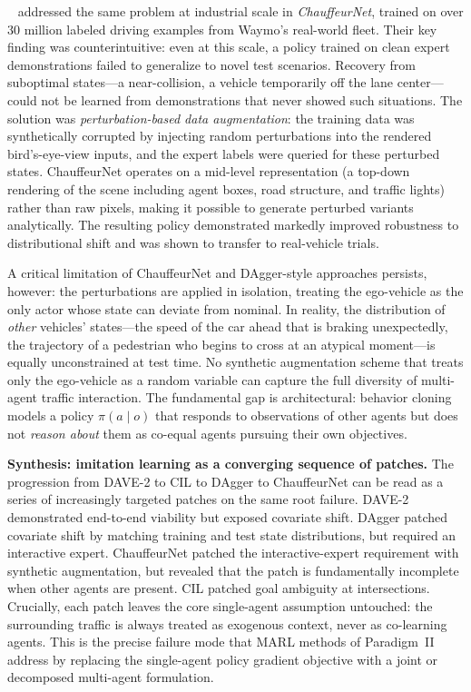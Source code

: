 \documentclass[12pt, a4paper]{article}
\begin{document}
\citeauthor{bansal2018chauffeur}~\cite{bansal2018chauffeur} addressed the same
problem at industrial scale in \emph{ChauffeurNet}, trained on over 30 million
labeled driving examples from Waymo's real-world fleet.  Their key finding was
counterintuitive: even at this scale, a policy trained on clean expert
demonstrations failed to generalize to novel test scenarios.  Recovery from
suboptimal states---a near-collision, a vehicle temporarily off the lane
center---could not be learned from demonstrations that never showed such
situations.  The solution was \emph{perturbation-based data augmentation}: the
training data was synthetically corrupted by injecting random perturbations into
the rendered bird's-eye-view inputs, and the expert labels were queried for
these perturbed states.  ChauffeurNet operates on a mid-level representation
(a top-down rendering of the scene including agent boxes, road structure, and
traffic lights) rather than raw pixels, making it possible to generate
perturbed variants analytically.  The resulting policy demonstrated markedly
improved robustness to distributional shift and was shown to transfer to
real-vehicle trials.

A critical limitation of ChauffeurNet and DAgger-style approaches persists,
however: the perturbations are applied in isolation, treating the ego-vehicle
as the only actor whose state can deviate from nominal.  In reality, the
distribution of \emph{other} vehicles' states---the speed of the car ahead
that is braking unexpectedly, the trajectory of a pedestrian who begins to
cross at an atypical moment---is equally unconstrained at test time.  No
synthetic augmentation scheme that treats only the ego-vehicle as a random
variable can capture the full diversity of multi-agent traffic interaction.
The fundamental gap is architectural: behavior cloning models a policy
$\pi(a \mid o)$ that responds to observations of other agents but does not
\emph{reason about} them as co-equal agents pursuing their own objectives.

\smallskip\noindent\textbf{Synthesis: imitation learning as a converging sequence of
patches.}  The progression from DAVE-2 to CIL to DAgger to ChauffeurNet can
be read as a series of increasingly targeted patches on the same root failure.
DAVE-2 demonstrated end-to-end viability but exposed covariate shift.
DAgger patched covariate shift by matching training and test state distributions,
but required an interactive expert.  ChauffeurNet patched the interactive-expert
requirement with synthetic augmentation, but revealed that the patch is
fundamentally incomplete when other agents are present.  CIL patched goal
ambiguity at intersections.  Crucially, each patch leaves the core single-agent
assumption untouched: the surrounding traffic is always treated as exogenous
context, never as co-learning agents.  This is the precise failure mode that
MARL methods of Paradigm~II address by replacing the single-agent policy
gradient objective with a joint or decomposed multi-agent formulation.
\end{document}
